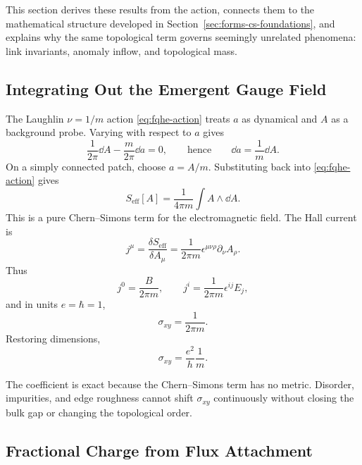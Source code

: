 This section derives these results from the action, connects them to the mathematical structure developed in Section~\ref{sec:forms-cs-foundations}, and explains why the same topological term governs seemingly unrelated phenomena: link invariants, anomaly inflow, and topological mass.

\subsection{Integrating Out the Emergent Gauge Field}
\label{subsec:fqhe-integrate-out}

The Laughlin $\nu=1/m$ action \eqref{eq:fqhe-action} treats $a$ as dynamical and $A$ as a background probe. Varying with respect to $a$ gives
\begin{equation}
  \frac{1}{2\pi}\dd A-\frac{m}{2\pi}\dd a=0,
  \qquad\text{hence}\qquad
  \dd a=\frac{1}{m}\dd A.
  \label{eq:fqhe-eom}
\end{equation}
On a simply connected patch, choose $a=A/m$. Substituting back into \eqref{eq:fqhe-action} gives
\begin{equation}
  S_{\mathrm{eff}}[A]
  =
  \frac{1}{4\pi m}\int A\wedge\dd A.
  \label{eq:fqhe-effective-action}
\end{equation}
This is a pure Chern--Simons term for the electromagnetic field. The Hall current is
\begin{equation}
  j^\mu
  =
  \frac{\delta S_{\mathrm{eff}}}{\delta A_\mu}
  =
  \frac{1}{2\pi m}\epsilon^{\mu\nu\rho}\partial_\nu A_\rho.
  \label{eq:fqhe-current}
\end{equation}
Thus
\begin{equation}
  j^0=\frac{B}{2\pi m},
  \qquad
  j^i=\frac{1}{2\pi m}\epsilon^{ij}E_j,
  \label{eq:fqhe-density-hall}
\end{equation}
and in units $e=\hbar=1$,
\begin{equation}
  \sigma_{xy}=\frac{1}{2\pi m}.
  \label{eq:fqhe-conductance-derived}
\end{equation}
Restoring dimensions,
\begin{equation}
  \sigma_{xy}=\frac{e^2}{h}\frac{1}{m}.
  \label{eq:fqhe-conductance-physical}
\end{equation}

The coefficient is exact because the Chern--Simons term has no metric. Disorder, impurities, and edge roughness cannot shift $\sigma_{xy}$ continuously without closing the bulk gap or changing the topological order.

\subsection{Fractional Charge from Flux Attachment}
\label{subsec:fqhe-fractional-charge}


